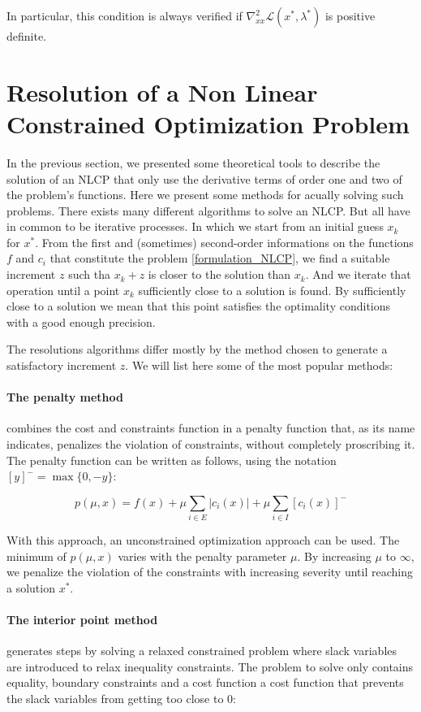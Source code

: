 In particular, this condition is always verified if $\nabla_{xx}^2\mathcal{L}(x^*,\lambda^*)$ is positive definite.

\section{Resolution of a Non Linear Constrained Optimization Problem}

In the previous section, we presented some theoretical tools to describe the solution of an NLCP that only use the derivative terms of order one and two of the problem's functions.
Here we present some methods for acually solving such problems.
There exists many different algorithms to solve an NLCP.
But all have in common to be iterative processes.
In which we start from an initial guess $x_k$ for $x^*$.
From the first and (sometimes) second-order informations on the functions $f$ and $c_i$ that constitute the problem \ref{formulation_NLCP}, we find a suitable increment $z$ such tha $x_k+z$ is closer to the solution than $x_k$.
And we iterate that operation until a point $x_k$ sufficiently close to a solution is found.
By sufficiently close to a solution we mean that this point satisfies the optimality conditions with a good enough precision.

The resolutions algorithms differ mostly by the method chosen to generate a satisfactory increment $z$. We will list here some of the most popular methods:

\paragraph {The penalty method} combines the cost and constraints function in a penalty function that, as its name indicates, penalizes the violation of constraints, without completely proscribing it.
The penalty function can be written as follows, using the notation $[y]^- = \max\{0, -y\}$:

\begin{equation}
  \label{penalty_function}
  p(\mu, x) = f(x) + \mu \sum_{i\in E}|c_i(x)| + \mu \sum_{i\in I} [c_i(x)]^-
\end{equation}

With this approach, an unconstrained optimization approach can be used.
The minimum of $p(\mu,x)$ varies with the penalty parameter $\mu$.
By increasing $\mu$ to $\infty$, we penalize the violation of the constraints with increasing severity until reaching a solution $x^*$.

\paragraph{The interior point method} generates steps by solving a relaxed constrained problem where slack variables are introduced to relax inequality constraints.
The problem to solve only contains equality, boundary constraints and a cost function a cost function that prevents the slack variables from getting too close to 0:

